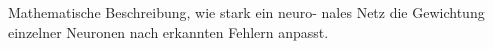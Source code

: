 \documentclass[preview]{standalone}
\begin{document}
\begin{center}
\noindent Mathematische Beschreibung, wie stark ein neuro- \linebreak nales Netz die Gewichtung einzelner Neuronen nach erkannten Fehlern anpasst.
\end{center}
\end{document}
